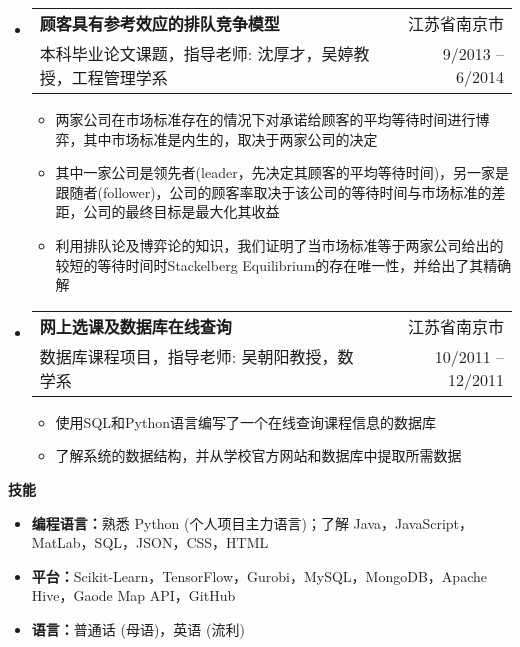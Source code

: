 \documentclass[letterpaper,9pt]{ctexart}
\makeatletter
\newcommand{\resitem}[1]{\item #1 \vspace{-2pt}}
\newcommand{\resheading}[1]{{\large \colorbox{mygrey}{\begin{minipage}{\textwidth}{\textbf{#1 \vphantom{p\^{E}}}}\end{minipage}}}}
\newcommand{\ressubheading}[4]{
\begin{tabular*}{6.5in}{l@{\extracolsep{\fill}}r}
    \textbf{#1} & #2 \\
    #3 & #4 \\
\end{tabular*}\vspace{-6pt}}
\makeatother
\begin{document}
\begin{itemize}




\item 
\ressubheading{顾客具有参考效应的排队竞争模型}{江苏省南京市}{本科毕业论文课题，指导老师: 沈厚才，吴婷教授，工程管理学系}{9/2013 -- 6/2014}
\begin{itemize}
\resitem{两家公司在市场标准存在的情况下对承诺给顾客的平均等待时间进行博弈，其中市场标准是内生的，取决于两家公司的决定}
\resitem{其中一家公司是领先者(leader，先决定其顾客的平均等待时间)，另一家是跟随者(follower)，公司的顾客率取决于该公司的等待时间与市场标准的差距，公司的最终目标是最大化其收益}
\resitem{利用排队论及博弈论的知识，我们证明了当市场标准等于两家公司给出的较短的等待时间时Stackelberg Equilibrium的存在唯一性，并给出了其精确解}
\end{itemize}


\item 
\ressubheading{网上选课及数据库在线查询}{江苏省南京市}{数据库课程项目，指导老师: 吴朝阳教授，数学系}{10/2011 -- 12/2011}
\begin{itemize}
\resitem{使用SQL和Python语言编写了一个在线查询课程信息的数据库}
\resitem{了解系统的数据结构，并从学校官方网站和数据库中提取所需数据}
\end{itemize}

\end{itemize}


\resheading{技能}
\begin{itemize}
\item \textbf{编程语言：}熟悉 Python (个人项目主力语言)；了解 Java，JavaScript，MatLab，SQL，JSON，CSS，HTML
\item \textbf{平台：}Scikit-Learn，TensorFlow，Gurobi，MySQL，MongoDB，Apache Hive，Gaode Map API，GitHub
\item \textbf{语言：}普通话 (母语)，英语 (流利)
\end{itemize}
\end{document}
